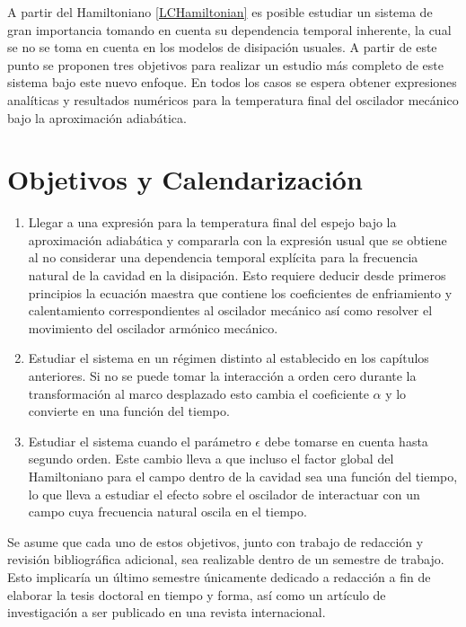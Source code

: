 \documentclass[10pt,a4paper]{report}
\begin{document}
A partir del Hamiltoniano \eqref{LCHamiltonian} es posible estudiar un sistema de gran importancia tomando en cuenta su dependencia temporal inherente, la cual se no se toma en cuenta en los modelos de disipación usuales\cite{CavesIF}. A partir de este punto se proponen tres objetivos para realizar un estudio más completo de este sistema bajo este nuevo enfoque. En todos los casos se espera obtener expresiones analíticas y resultados numéricos  para la temperatura final del oscilador mecánico bajo la aproximación adiabática.

\section{Objetivos y Calendarización}

\begin{enumerate}
\item Llegar a una expresión para la temperatura final del espejo bajo la aproximación adiabática y compararla con la expresión usual que se obtiene al no considerar una dependencia temporal explícita para la frecuencia natural de la cavidad en la disipación. Esto requiere deducir desde primeros principios la ecuación maestra que contiene los coeficientes de enfriamiento y calentamiento correspondientes al oscilador mecánico así como resolver el movimiento del oscilador armónico mecánico.

\item Estudiar el sistema en un régimen distinto al establecido en los capítulos anteriores. Si no se puede tomar la interacción a orden cero durante la transformación al marco desplazado esto cambia el coeficiente $\alpha$ y lo convierte en una función del tiempo.

\item Estudiar el sistema cuando el parámetro $\epsilon$ debe tomarse en cuenta hasta segundo orden. Este cambio lleva a que incluso el factor global del Hamiltoniano para el campo dentro de la cavidad sea una función del tiempo, lo que lleva a estudiar el efecto sobre el oscilador de interactuar con un campo cuya frecuencia natural oscila en el tiempo. 
\end{enumerate}

Se asume que cada uno de estos objetivos, junto con trabajo de redacción y revisión bibliográfica adicional, sea realizable dentro de un semestre de trabajo. Esto implicaría un último semestre únicamente dedicado a redacción a fin de elaborar la tesis doctoral en tiempo y forma, así como un artículo de investigación a ser publicado en una revista internacional.



\end{document}
